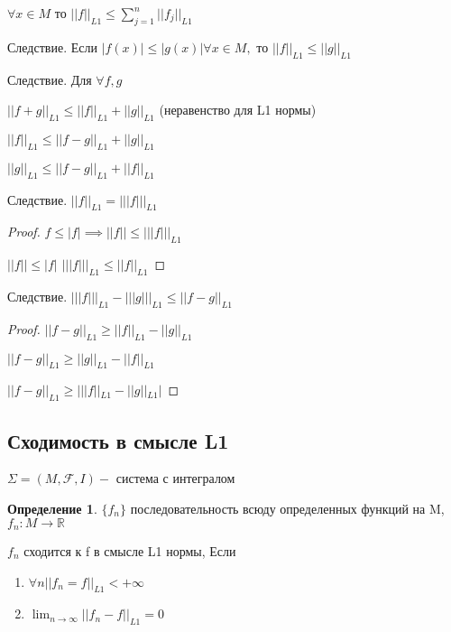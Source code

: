 \documentclass[a4paper]{article}
\theoremstyle{definition}
\newtheorem*{definition}{Определение}
\theoremstyle{remark}
\begin{document}
$\forall x \in M $ то $||f||_{L1}\leq \sum_{j = 1}^{n} ||f_j||_{L1} $

Следствие. Если $|f(x)|\leq |g(x)| \forall x \in M,$ то $||f||_{L1}\leq ||g||_{L1}$

Следствие. Для $\forall f, g$

$||f+g||_{L1}\leq ||f||_{L1} + ||g||_{L1}$ (неравенство для L1 нормы)

$||f||_{L1}\leq ||f-g||_{L1} + ||g||_{L1}$

$||g||_{L1} \leq ||f-g||_{L1}+||f||_{L1}$

Следствие. $||f||_{L1} = |||f|||_{L1}$
\begin{proof}
     $f\leq |f|\implies ||f||\leq |||f|||_{L1}$

     $||f||\leq |f|$
     $|||f|||_{L1}\leq ||f||_{L1}$
\end{proof}
Следствие. $|||f|||_{L1}  - |||g|||_{L1}\leq ||f-g||_{L1}$
\begin{proof}
     $||f-g||_{L1}\geq ||f||_{L1} - ||g||_{L1}$

     $||f - g||_{L1}\geq ||g||_{L1} - ||f||_{L1}$

     $||f-g||_{L1}\geq| ||f||_{L1} - ||g||_{L1}|$
\end{proof}
    \subsection{ Сходимость в смысле L1}
    $\Sigma = (M, \mathcal{F} , I) -$ система с интегралом
\begin{definition}
     $\{f_n\}$ последовательность всюду определенных функций на M, $f_n: M\to \mathbb{R} $

     $f_n$ сходится к f в смысле L1 нормы, Если
     \begin{enumerate}
          \item $\forall n ||f_n = f||_{L1}< +\infty$
          \item $\lim_{n \to \infty} ||f_n - f||_{L1} = 0 $
     \end{enumerate}
\end{definition}
\end{document}
